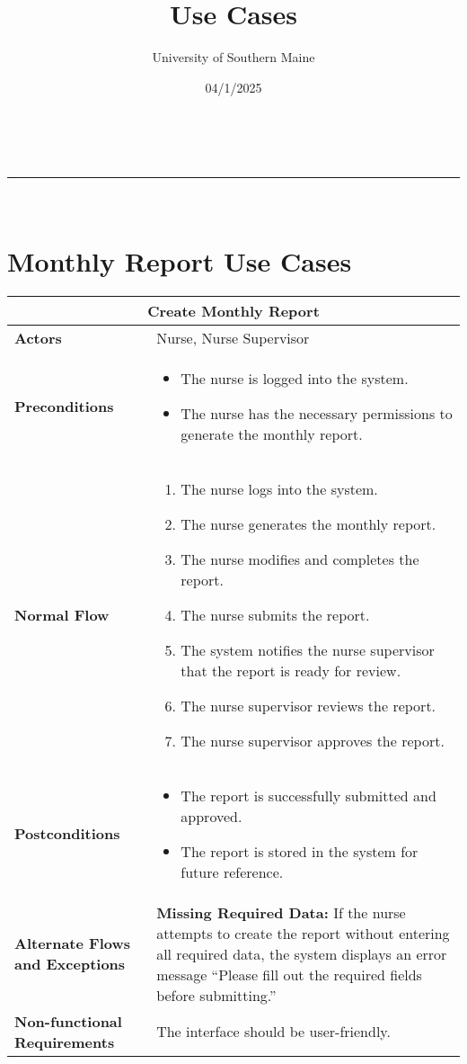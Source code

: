 \documentclass{article}
\makeatletter
\newcommand{\linia}{\rule{\linewidth}{0.5pt}}
\renewcommand{\maketitle}{
\begin{center}
\vspace{2ex}
{\huge \textsc{\@title}}
\vspace{1ex}
\\
\linia\\
\@author \hfill \@date
\vspace{4ex}
\end{center}
}
\makeatother
\begin{document}
\title{Use Cases}

\author{University of Southern Maine}

\date{04/1/2025}

\maketitle

\section{Monthly Report Use Cases}
\renewcommand{\arraystretch}{1.3} %

\begin{longtable}{| p{5cm} | p{10cm} |}
    \hline
    \multicolumn{2}{|c|}{\textbf{Create Monthly Report}} \\
    \hline
    \textbf{Actors} & Nurse, Nurse Supervisor \\
    \hline
    \textbf{Preconditions} & 
    \begin{itemize}
        \item The nurse is logged into the system.
        \item The nurse has the necessary permissions to generate the monthly report.
    \end{itemize} \\
    \hline
    \textbf{Normal Flow} & 
    \begin{enumerate}
        \item The nurse logs into the system.
        \item The nurse generates the monthly report.
        \item The nurse modifies and completes the report.
        \item The nurse submits the report.
        \item The system notifies the nurse supervisor that the report is ready for review.
        \item The nurse supervisor reviews the report.
        \item The nurse supervisor approves the report.
    \end{enumerate} \\
    \hline
    \textbf{Postconditions} & 
    \begin{itemize}
        \item The report is successfully submitted and approved.
        \item The report is stored in the system for future reference.
    \end{itemize} \\
    \hline
    \textbf{Alternate Flows and Exceptions} & 
    \textbf{Missing Required Data:} If the nurse attempts to create the report without entering all required data, the system displays an error message “Please fill out the required fields before submitting.” \\
    \hline
    \textbf{Non-functional Requirements} & The interface should be user-friendly. \\
    \hline
\end{longtable}
\end{document}
